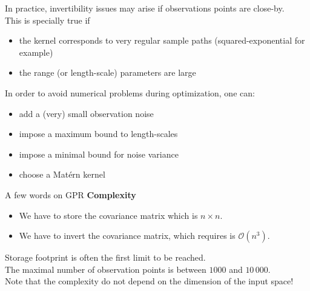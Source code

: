 \documentclass{beamer}
\begin{document}
\begin{frame}{}
In practice, invertibility issues may arise if observations points are close-by. \\
\vspace{3mm}
This is specially true if
\begin{itemize}
	\item the kernel corresponds to very regular sample paths (squared-exponential for example)
	\item the range (or length-scale) parameters are large
\end{itemize}
\vspace{3mm}
In order to avoid numerical problems during optimization, one can:
\begin{itemize}
	\item add a (very) small observation noise\\
	\item impose a maximum bound to length-scales
	\item impose a minimal bound for noise variance 
	\item choose a Mat\'ern kernel
\end{itemize}
\end{frame}

\begin{frame}{}
A few words on GPR \textbf{Complexity}\\ \vspace{2mm}
	\begin{itemize}
  		\item {} We have to store the covariance matrix which is $n \times n$.
  		\item {} We have to invert the covariance matrix, which requires is $\mathcal{O}(n^3)$.\\
	\end{itemize}
Storage footprint is often the first limit to be reached.\\
\vspace{5mm}
The maximal number of observation points is between $1000$ and $10\,000$.\\
\vspace{2mm}
Note that the complexity do not depend on the dimension of the input space!
\end{frame}

\end{document}
